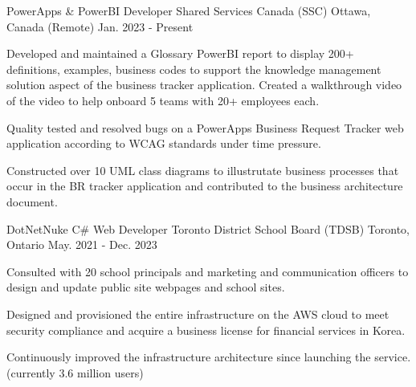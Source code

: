

\begin{cventries}

  \cventry
    {PowerApps \& PowerBI Developer} %
    {Shared Services Canada (SSC)} %
    {Ottawa, Canada (Remote)} %
    {Jan. 2023 - Present} %
    {
      \begin{cvitems} %
        \item {Developed and maintained a Glossary PowerBI report to display 200+ definitions, examples, business codes to support the knowledge management solution aspect of the business tracker application. Created a walkthrough video of the video to help onboard 5 teams with 20+ employees each. }
        \item {Quality tested and resolved bugs on a PowerApps Business Request Tracker web application according to WCAG standards under time pressure.  }
        \item {Constructed over 10\+ UML class diagrams to illustrutate business processes that occur in the BR tracker application and contributed to the business architecture document.}
      \end{cvitems}
    }

\cventry
    {DotNetNuke C\# Web Developer} %
    {Toronto District School Board (TDSB)} %
    {Toronto, Ontario} %
    {May. 2021 - Dec. 2023} %
    {
      \begin{cvitems} %
        \item {Consulted with 20\+ school principals and marketing and communication officers to design and update public site webpages and school sites.  }
        \item {Designed and provisioned the entire infrastructure on the AWS cloud to meet security compliance and acquire a business license for financial services in Korea.}
        \item {Continuously improved the infrastructure architecture since launching the service. (currently 3.6 million users)}
      \end{cvitems}
    }


\end{cventries}
